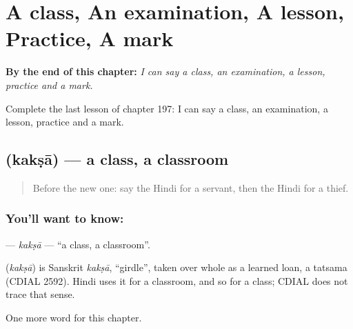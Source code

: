 
\chapter{A class, An examination, A lesson, Practice, A mark}
\label{ch:hi-a-class-an-examination-a-lesson-practice-a-mark}

\begin{chapteropening}
\textbf{By the end of this chapter:} \emph{I can say a class, an examination, a lesson, practice and a mark.}

Complete the last lesson of chapter 197: I can say a class, an examination, a lesson, practice and a mark.
\end{chapteropening}

\section[\texorpdfstring{\hi{कक्षा} (kakṣā)}{कक्षा (kakṣā)}]{ (kakṣā) — a class, a classroom}

\label{lesson:HI-C197-kaksa}



\begin{quote}
Before the new one: say the Hindi for a servant, then the Hindi for a thief.
\end{quote}

\subsection*{You'll want to know: }
\textbf{} — \emph{kakṣā} — \textquotedblleft{}a class, a classroom\textquotedblright{}.

\begin{cousinweb}
\textbf{} (\emph{kakṣā}) is Sanskrit \emph{kakṣā}, \textquotedblleft{}girdle\textquotedblright{}, taken over whole as a learned loan, a tatsama (CDIAL 2592). Hindi uses it for a classroom, and so for a class; CDIAL does not trace that sense.
\end{cousinweb}

\begin{grammarlens}[title={What you've built}]
One more word for this chapter.
\end{grammarlens}

